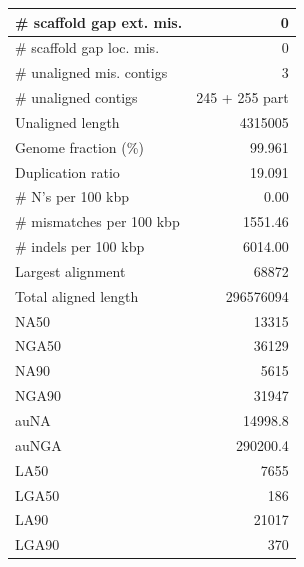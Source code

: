 \documentclass[12pt,a4paper]{article}
\begin{document}
\begin{table}[ht]
\begin{center}
\begin{tabular}{|l*{1}{|r}|}
\# scaffold gap ext. mis. & 0 \\ \hline
\# scaffold gap loc. mis. & 0 \\ \hline
\# unaligned mis. contigs & 3 \\ \hline
\# unaligned contigs & 245 + 255 part \\ \hline
Unaligned length & 4315005 \\ \hline
Genome fraction (\%) & 99.961 \\ \hline
Duplication ratio & 19.091 \\ \hline
\# N's per 100 kbp & 0.00 \\ \hline
\# mismatches per 100 kbp & 1551.46 \\ \hline
\# indels per 100 kbp & 6014.00 \\ \hline
Largest alignment & 68872 \\ \hline
Total aligned length & 296576094 \\ \hline
NA50 & 13315 \\ \hline
NGA50 & 36129 \\ \hline
NA90 & 5615 \\ \hline
NGA90 & 31947 \\ \hline
auNA & 14998.8 \\ \hline
auNGA & 290200.4 \\ \hline
LA50 & 7655 \\ \hline
LGA50 & 186 \\ \hline
LA90 & 21017 \\ \hline
LGA90 & 370 \\ \hline
\end{tabular}
\end{center}
\end{table}
\end{document}

